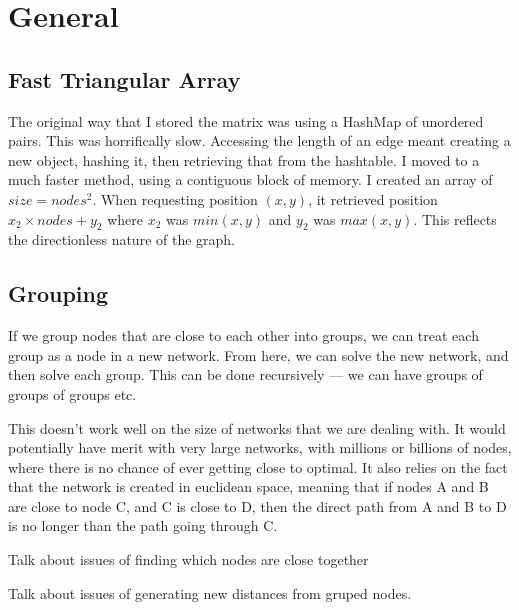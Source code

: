 \documentclass[a4paper, 11pt,table]{article}
\begin{document}
	\section{General}
	\subsection{Fast Triangular Array}
	The original way that I stored the matrix was using a HashMap of unordered pairs. This was horrifically slow. Accessing the length of an edge meant creating a new object, hashing it, then retrieving that from the hashtable. I moved to a much faster method, using a contiguous block of memory. I created an array of $size=nodes^2$. When requesting position $(x,y)$, it retrieved position $x_2 \times nodes + y_2$ where $x_2$ was $min(x,y)$ and $y_2$ was $max(x,y)$. This reflects the directionless nature of the graph.
	
	\subsection{Grouping}
	If we group nodes that are close to each other into groups, we can treat each group as a node in a new network. From here, we can solve the new network, and then solve each group. This can be done recursively --- we can have groups of groups of groups etc.
	
	This doesn't work well on the size of networks that we are dealing with. It would potentially have merit with very large networks, with millions or billions of nodes, where there is no chance of ever getting close to optimal. It also relies on the fact that the network is created in euclidean space, meaning that if nodes A and B are close to node C, and C is close to D, then the direct path from A and B to D is no longer than the path going through C.
	
	Talk about issues of finding which nodes are close together
	
	Talk about issues of generating new distances from gruped nodes.
	
\end{document}

